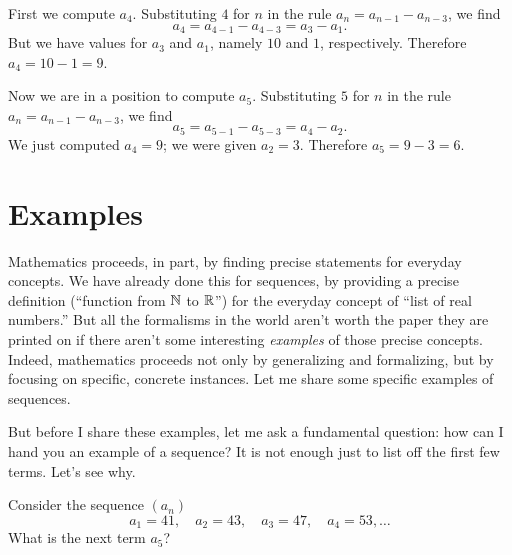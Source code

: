 \begin{solution}
  First we compute $a_4$.  Substituting $4$ for $n$ in the rule $a_n = a_{n-1} - a_{n-3}$, we find
$$
a_4 = a_{4-1} - a_{4-3} = a_3 - a_1.
$$
But we have values for $a_3$ and $a_1$, namely $10$ and $1$, respectively.  Therefore $a_4 = 10 - 1 = 9$.

Now we are in a position to compute $a_5$.  Substituting $5$ for $n$ in the rule $a_n = a_{n-1} - a_{n-3}$, we find
$$
a_5 = a_{5-1} - a_{5-3} = a_4 - a_2.
$$
We just computed $a_4 = 9$; we were given $a_2 = 3$.  Therefore $a_5 = 9 - 3 = 6$.
\end{solution}


\section{Examples}


Mathematics proceeds, in part, by finding precise statements for
everyday concepts.  We have already done this for sequences, by
providing a precise definition (``function from $\mathbb{N}$ to $\mathbb{R}$'') for
the everyday concept of ``list of real numbers.''  But all the
formalisms in the world aren't worth the paper they are printed on if
there aren't some interesting \textit{examples} of those precise
concepts.  Indeed, mathematics proceeds not only by generalizing and
formalizing, but by focusing on specific, concrete instances.  Let me
share some specific examples of sequences.

But before I share these examples, let me ask a fundamental question:
how can I hand you an example of a sequence? It is not enough just to
list off the first few terms.  Let's see why.

\begin{example}
Consider the sequence $(a_n)$
$$
a_1 = 41, \quad a_2 = 43, \quad a_3 = 47, \quad a_4 = 53, \ldots
$$
What is the next term $a_5$?
\end{example}


